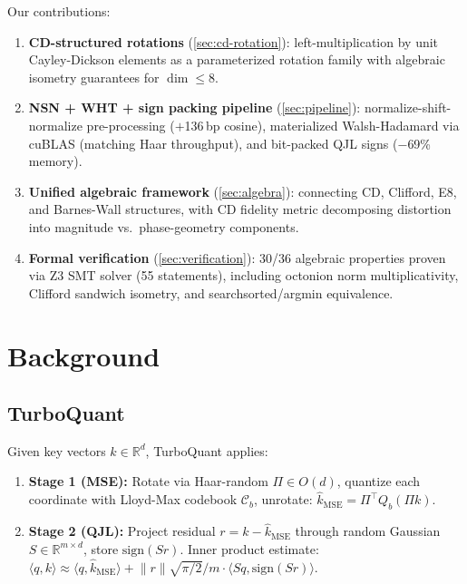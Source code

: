 \documentclass[letterpaper,11pt]{article}
\newcommand{\R}{\mathbb{R}}
\newcommand{\norm}[1]{\lVert #1 \rVert}
\newcommand{\inner}[2]{\langle #1, #2 \rangle}
\begin{document}
\noindent
Our contributions:
\begin{enumerate}[nosep]
  \item \textbf{CD-structured rotations} (\cref{sec:cd-rotation}):
        left-multiplication by unit Cayley-Dickson elements as a
        parameterized rotation family with algebraic isometry
        guarantees for $\dim \leq 8$.
  \item \textbf{NSN + WHT + sign packing pipeline} (\cref{sec:pipeline}):
        normalize-shift-normalize pre-processing ($+$136\,bp cosine),
        materialized Walsh-Hadamard via cuBLAS (matching Haar throughput),
        and bit-packed QJL signs ($-$69\% memory).
  \item \textbf{Unified algebraic framework} (\cref{sec:algebra}):
        connecting CD, Clifford, E8, and Barnes-Wall structures,
        with CD fidelity metric decomposing distortion into magnitude
        vs.\ phase-geometry components.
  \item \textbf{Formal verification} (\cref{sec:verification}):
        30/36 algebraic properties proven via Z3 SMT solver (55 statements),
        including octonion norm multiplicativity, Clifford sandwich
        isometry, and searchsorted/argmin equivalence.
\end{enumerate}

\section{Background}
\label{sec:background}

\subsection{TurboQuant}

Given key vectors $k \in \R^d$, TurboQuant applies:
\begin{enumerate}[nosep]
  \item \textbf{Stage 1 (MSE):} Rotate via Haar-random $\Pi \in O(d)$,
        quantize each coordinate with Lloyd-Max codebook $\mathcal{C}_b$,
        unrotate: $\hat{k}_{\mathrm{MSE}} = \Pi^\top Q_b(\Pi k)$.
  \item \textbf{Stage 2 (QJL):} Project residual $r = k - \hat{k}_{\mathrm{MSE}}$
        through random Gaussian $S \in \R^{m \times d}$, store
        $\mathrm{sign}(Sr)$. Inner product estimate:
        $\inner{q}{k} \approx \inner{q}{\hat{k}_{\mathrm{MSE}}}
         + \norm{r} \sqrt{\pi/2}/m \cdot \inner{Sq}{\mathrm{sign}(Sr)}$.
\end{enumerate}
\end{document}

